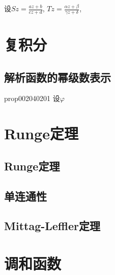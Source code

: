 \begin{problemset}
\item\label{exer002030320}设$Sz = \frac{az+b}{cz+d}$, $Tz = \frac{\alpha{}z + \beta}{\gamma{}z + \delta}$,

\end{problemset}






\chapter{复积分}\label{chapter00204}

\section{解析函数的幂级数表示}\label{section0020402}

\begin{proposition}{}{prop002040201}
设$\varphi$
\end{proposition}

\chapter{Runge定理}\label{chapter00208}

\section{Runge定理}\label{section0020801}


\section{单连通性}\label{section0020802}


\section{Mittag-Leffler定理}\label{section0020803}


\chapter{调和函数}\label{chapter00210}















